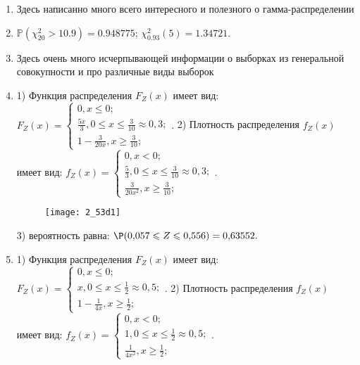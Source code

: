 \documentclass[a4paper,12pt]{article}
\begin{document}
\begin{enumerate}

\item


Здесь написанно много всего интересного и полезного о гамма-распределении



\item


$\mathbb{P}(\chi _{20}^{2} > 10.9) =  0.948775$; $\chi _{0.93}^{2} (5) = 1.34721$.



\item


Здесь очень много исчерпывающей информации о выборках из генеральной совокупности и про различные виды выборок



\item


1) Функция распределения $F_Z(x)$ имеет вид:
$
F_Z(x)=\left\{
\begin{array}{l}
0, x\leqslant 0;\\
\frac{5 x}{3}, 0\leqslant x\leqslant \frac{3}{10}\approx 0,\!3;\\
1 - \frac{3}{20 x}, x\geqslant\frac{3}{10};
\end{array}.
\right.
$
2) Плотность распределения $f_Z(x)$ имеет вид:
$
f_Z(x)=\left\{
\begin{array}{l}
0, x<0;\\
\frac{5}{3}, 0\leqslant x\leqslant \frac{3}{10}\approx 0,\!3;\\
\frac{3}{20 x^{2}}, x\geqslant\frac{3}{10};
\end{array}.
\right.
$


\begin{figure}[H]
    \texttt{[image: 2\_53d1]}
\end{figure}


3) вероятность равна:
$
\P(0,\!057\leqslant Z\leqslant 0,\!556)=
0,\!63552.
$



\item


1) Функция распределения $F_Z(x)$ имеет вид:
$
F_Z(x)=\left\{
\begin{array}{l}
0, x\leqslant 0;\\
x, 0\leqslant x\leqslant \frac{1}{2}\approx 0,\!5;\\
1 - \frac{1}{4 x}, x\geqslant\frac{1}{2};
\end{array}.
\right.
$
2) Плотность распределения $f_Z(x)$ имеет вид:
$
f_Z(x)=\left\{
\begin{array}{l}
0, x<0;\\
1, 0\leqslant x\leqslant \frac{1}{2}\approx 0,\!5;\\
\frac{1}{4 x^{2}}, x\geqslant\frac{1}{2};
\end{array}.
\right.
$



\end{enumerate}
\end{document}
